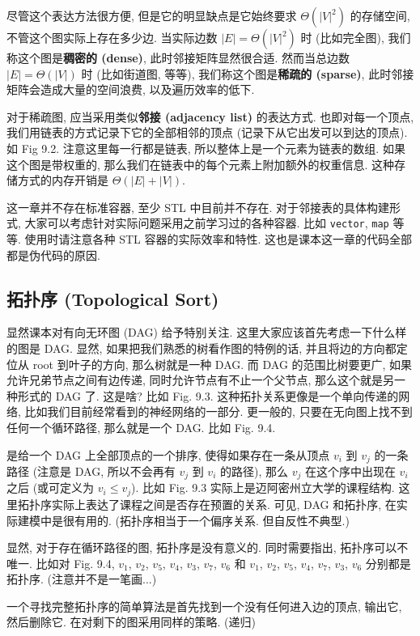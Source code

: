 \documentclass[a4paper]{ctexart}
\theoremstyle{definition}
\theoremstyle{definition}
\begin{document}
尽管这个表达方法很方便, 但是它的明显缺点是它始终要求 $\Theta(|V|^2)$ 的存储空间,
不管这个图实际上存在多少边. 当实际边数 $|E| = \Theta(|V|^2)$ 时 (比如完全图),
我们称这个图是{\bf 稠密的 (dense)}, 此时邻接矩阵显然很合适.
然而当总边数 $|E| = \Theta(|V|)$ 时 (比如街道图, 等等),
我们称这个图是{\bf 稀疏的 (sparse)}, 此时邻接矩阵会造成大量的空间浪费,
以及遍历效率的低下. 

对于稀疏图, 应当采用类似{\bf 邻接 (adjacency list)} 的表达方式. 也即对每一个顶点,
我们用链表的方式记录下它的全部相邻的顶点 (记录下从它出发可以到达的顶点).
如 Fig 9.2. 注意这里每一行都是链表, 所以整体上是一个元素为链表的数组.
如果这个图是带权重的, 那么我们在链表中的每个元素上附加额外的权重信息.
这种存储方式的内存开销是 $\Theta(|E| + |V|)$.

这一章并不存在标准容器, 至少 STL 中目前并不存在. 对于邻接表的具体构建形式,
大家可以考虑针对实际问题采用之前学习过的各种容器. 比如 \verb|vector|, \verb|map| 等等.
使用时请注意各种 STL 容器的实际效率和特性. 这也是课本这一章的代码全部都是伪代码的原因.

\subsection{拓扑序 (Topological Sort)}

显然课本对有向无环图 (DAG) 给予特别关注. 这里大家应该首先考虑一下什么样的图是 DAG.
显然, 如果把我们熟悉的树看作图的特例的话, 并且将边的方向都定位从 root 到叶子的方向,
那么树就是一种 DAG. 而 DAG 的范围比树要更广, 如果允许兄弟节点之间有边传递,
同时允许节点有不止一个父节点, 那么这个就是另一种形式的 DAG 了. 这是啥? 
比如 Fig. 9.3. 这种拓扑关系更像是一个单向传递的网络,
比如我们目前经常看到的神经网络的一部分. 更一般的,
只要在无向图上找不到任何一个循环路径, 那么就是一个 DAG. 比如 Fig. 9.4.

 是给一个 DAG 上全部顶点的一个排序,
使得如果存在一条从顶点 $v_i$ 到 $v_j$ 的一条路径
(注意是 DAG, 所以不会再有 $v_j$ 到 $v_i$ 的路径),
那么 $v_j$ 在这个序中出现在 $v_i$ 之后 (或可定义为 $v_i \leq v_j$).
比如 Fig. 9.3 实际上是迈阿密州立大学的课程结构.
这里拓扑序实际上表达了课程之间是否存在预置的关系.
可见, DAG 和拓扑序, 在实际建模中是很有用的.
(拓扑序相当于一个偏序关系. 但自反性不典型.)

显然, 对于存在循环路径的图, 拓扑序是没有意义的. 同时需要指出, 拓扑序可以不唯一.
比如对 Fig. 9.4, $v_1$, $v_2$, $v_5$, $v_4$, $v_3$, $v_7$, $v_6$ 和
$v_1$, $v_2$, $v_5$, $v_4$, $v_7$, $v_3$, $v_6$ 分别都是拓扑序. 
(注意并不是一笔画...)

一个寻找完整拓扑序的简单算法是首先找到一个没有任何进入边的顶点,
输出它, 然后删除它. 在对剩下的图采用同样的策略. (递归)
\end{document}
